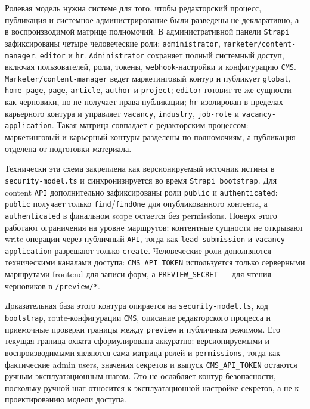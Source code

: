 Ролевая модель нужна системе для того, чтобы редакторский процесс, публикация и
системное администрирование были разведены не декларативно, а в воспроизводимой
матрице полномочий. В административной панели \texttt{Strapi} зафиксированы четыре
человеческие роли: \texttt{administrator}, \texttt{marketer/content-manager},
\texttt{editor} и \texttt{hr}. \texttt{Administrator} сохраняет полный системный доступ,
включая пользователей, роли, токены, \texttt{webhook}-настройки и конфигурацию
\texttt{CMS}. \texttt{Marketer/content-manager} ведет маркетинговый контур и публикует
\texttt{global}, \texttt{home-page}, \texttt{page}, \texttt{article}, \texttt{author} и
\texttt{project}; \texttt{editor} готовит те же сущности как черновики, но не получает
права публикации; \texttt{hr} изолирован в пределах карьерного контура и управляет
\texttt{vacancy}, \texttt{industry}, \texttt{job-role} и
\texttt{vacancy-application}. Такая матрица совпадает с редакторским процессом: маркетинговый
и карьерный контуры разделены по полномочиям, а публикация отделена от подготовки
материала.

Технически эта схема закреплена как версионируемый источник истины в
\texttt{security-model.ts} и синхронизируется во время \texttt{Strapi bootstrap}. Для
content \texttt{API} дополнительно зафиксированы роли \texttt{public} и
\texttt{authenticated}: \texttt{public} получает только \texttt{find}/\texttt{findOne}
для опубликованного контента, а \texttt{authenticated} в финальном scope остается без
permissions. Поверх этого работают ограничения на уровне маршрутов: контентные сущности не
открывают write-операции через публичный \texttt{API}, тогда как
\texttt{lead-submission} и \texttt{vacancy-application} разрешают только \texttt{create}.
Человеческие роли дополняются техническими каналами доступа:
\texttt{CMS\_API\_TOKEN} используется только серверными маршрутами frontend для записи
форм, а \texttt{PREVIEW\_SECRET} --- для чтения черновиков в \texttt{/preview/*}.

Доказательная база этого контура опирается на \texttt{security-model.ts}, код
\texttt{bootstrap}, route-конфигурации \texttt{CMS}, описание редакторского процесса и
приемочные проверки границы между \texttt{preview} и публичным режимом. Его текущая граница охвата сформулирована
аккуратно: версионируемыми и воспроизводимыми являются сама матрица ролей и
\texttt{permissions}, тогда как фактические admin users, значения секретов и выпуск
\texttt{CMS\_API\_TOKEN} остаются ручным эксплуатационным шагом. Это не ослабляет
контур безопасности, поскольку ручной шаг
относится к эксплуатационной настройке секретов, а не к проектированию модели доступа.

